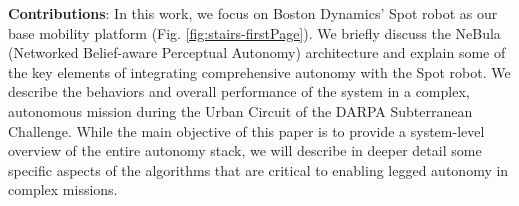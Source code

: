 \documentclass[letterpaper, 10pt, conference]{ieeeconf}      %
\newcommand{\ph}[1]{{\textbf{#1}:}} %
\newcommand{\rev}[1]{{\color{blue}#1}} %
\begin{document}


\ph{Contributions} %
In this work, we focus on Boston Dynamics' Spot robot as our base mobility platform (Fig. \ref{fig:stairs-firstPage}). 
We briefly discuss the NeBula (Networked Belief-aware Perceptual Autonomy) architecture and explain some of the key elements of integrating comprehensive autonomy %
with the Spot robot.
We describe the behaviors and overall performance of the system in a complex, autonomous mission during the Urban Circuit of the DARPA Subterranean Challenge.
While the main objective of this paper is to provide a system-level overview of the entire autonomy stack, we will describe in deeper detail some specific aspects of the algorithms that are critical to enabling legged autonomy in complex missions. 
\end{document}
